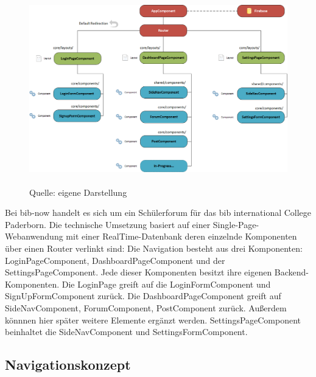 \documentclass[12pt,titlepage]{article}
\begin{document}
\vspace{2cm}

\begin{figure}[hbt!]
 \centering
 \includegraphics[width=400pt]{Konzepte/bibnow_Sitemap.png}
 \caption[Sitemap-Konzept]{\\Quelle: eigene Darstellung}
\end{figure}


\vspace{2cm}

Bei bib-now handelt es sich um ein Schülerforum für das bib international College Paderborn. Die technische Umsetzung basiert auf  einer Single-Page-Webanwendung mit einer RealTime-Datenbank deren einzelnde Komponenten über einen Router verlinkt sind: Die Navigation besteht aus drei Komponenten: LoginPageComponent, DashboardPageComponent und der SettingsPageComponent. Jede dieser Komponenten besitzt ihre eigenen Backend-Komponenten. Die LoginPage greift auf die LoginFormComponent und SignUpFormComponent zurück. Die DashboardPageComponent greift auf  SideNavComponent, ForumComponent, PostComponent zurück. Außerdem könnnen hier später weitere Elemente ergänzt werden. SettingsPageComponent beinhaltet die SideNavComponent und SettingsFormComponent. 


\pagebreak

\subsection{Navigationskonzept}

\vspace{2cm}
\end{document}
